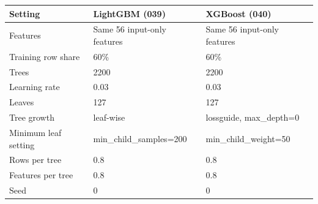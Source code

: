 \begin{tabular}{lll}
\toprule
Setting & LightGBM (039) & XGBoost (040) \\
\midrule
Features & Same 56 input-only features & Same 56 input-only features \\
Training row share & 60\% & 60\% \\
Trees & 2200 & 2200 \\
Learning rate & 0.03 & 0.03 \\
Leaves & 127 & 127 \\
Tree growth & leaf-wise & lossguide, max\_depth=0 \\
Minimum leaf setting & min\_child\_samples=200 & min\_child\_weight=50 \\
Rows per tree & 0.8 & 0.8 \\
Features per tree & 0.8 & 0.8 \\
Seed & 0 & 0 \\
\bottomrule
\end{tabular}
